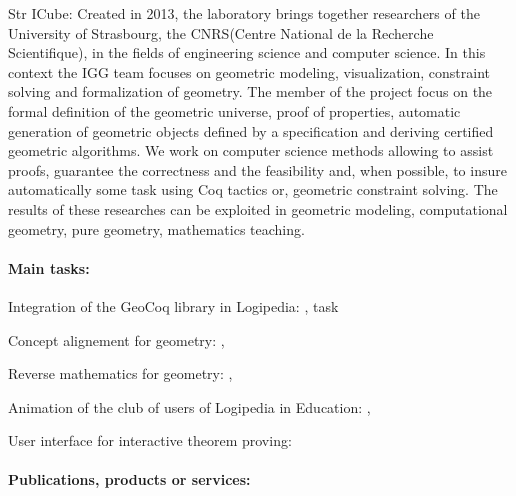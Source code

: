 \begin{sitedescription}{Str}
ICube: Created in 2013, the laboratory brings together researchers of the University of Strasbourg, the CNRS(Centre National de la Recherche Scientifique), in the fields of engineering science and computer science.
In this context the IGG team focuses on geometric modeling, visualization, constraint solving and formalization of geometry. The member of the project focus on the formal definition of the geometric universe, proof of properties, automatic generation of geometric objects defined by a specification and deriving certified geometric algorithms. We work on computer science methods allowing to assist proofs, guarantee the correctness and the feasibility and, when possible, to insure automatically some task using Coq tactics or, geometric constraint solving. The results of these researches can be exploited in geometric modeling, computational geometry, pure geometry, mathematics teaching.

\paragraph{Main tasks:}



\begin{compactitem}
\item Integration of the GeoCoq library in Logipedia: , task 
\item Concept alignement for geometry: , \taskref{}{}
\item Reverse mathematics for geometry: , \taskref{}{}
\item Animation of the club of users of Logipedia in Education: ,  
\item User interface for interactive theorem proving:  
\end{compactitem}

\paragraph{Publications, products or services:}



\end{sitedescription}
